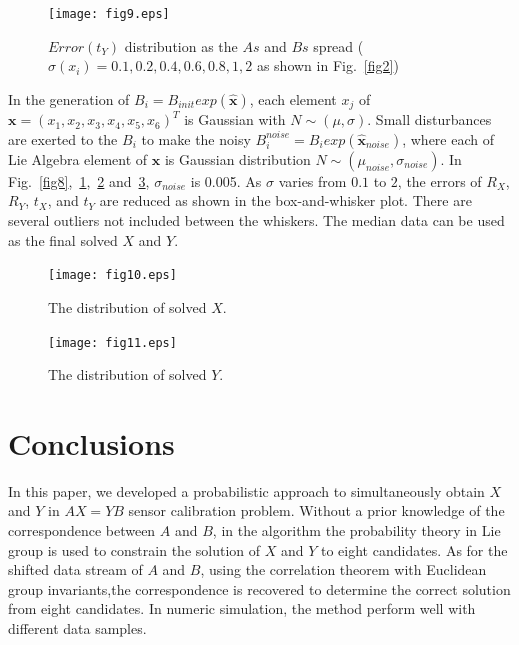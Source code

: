 \documentclass[letterpaper, 10 pt, conference]{ieeeconf}  %
\begin{document}
\begin{center}
\begin{figure}
\centering
\texttt{[image: fig9.eps]}
\caption{
$Error(t_Y)$ distribution as the $As$ and $Bs$ spread ($\sigma(x_i) = 0.1, 0.2, 0.4, 0.6, 0.8, 1, 2$ as shown in Fig.~\ref{fig2})
}
\label{fig9}
\end{figure}
\end{center}


In the generation of $B_i = B_{init} exp(\mathbf{\widehat{x}})$, each element $x_j$ of $\mathbf{x} = (x_1,x_2,x_3,x_4,x_5,x_6)^T $ is Gaussian with $N \sim (\mu,\sigma)$. Small disturbances are exerted to the $B_i$ to make the noisy $B_i^{noise} = B_i exp(\mathbf{\widehat{x}}_{noise})$, where each of Lie Algebra element of $\mathbf{x}$ is Gaussian distribution $N \sim (\mu_{noise},\sigma_{noise})$. In Fig.~\ref{fig8},~\ref{fig9},~\ref{fig10} and~\ref{fig11}, $\sigma_{noise}$ is 0.005. As $\sigma$ varies from $0.1$ to $2$, the errors of $R_X$, $R_Y$, $t_X$, and $t_Y$ are reduced as shown in the box-and-whisker plot. There are several outliers not included between the whiskers. The median data can be used as the final solved $X$ and $Y$.



\begin{center}
\begin{figure}
\centering
\texttt{[image: fig10.eps]}
\caption{
The distribution of solved $X$.
}
\label{fig10}
\end{figure}
\end{center}

\begin{center}
\begin{figure}
\centering
\texttt{[image: fig11.eps]}
\caption{
The distribution of solved $Y$.
}
\label{fig11}
\end{figure}
\end{center}

\section{Conclusions}
\label{sect5}

In this paper, we developed a probabilistic approach to simultaneously obtain  $X$ and $Y$ in $AX=YB$ sensor calibration problem. Without a prior knowledge of the correspondence between $A$ and $B$, in the algorithm the probability theory in Lie group is used to constrain the solution of $X$ and $Y$ to eight candidates. As for the shifted data stream of $A$ and $B$, using the correlation theorem with Euclidean group invariants,the correspondence is recovered to determine the correct solution from eight candidates. In numeric simulation, the method perform well with different data samples.
\end{document}
